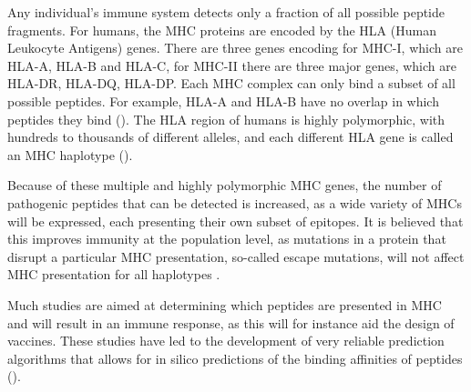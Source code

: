 
Any individual's immune system detects only a fraction of all possible
peptide fragments.
For humans, the MHC proteins are encoded by the
HLA (Human Leukocyte Antigens) genes.
There are three genes encoding for MHC-I, which are HLA-A, HLA-B and HLA-C,
for MHC-II there are three major genes, which are HLA-DR, HLA-DQ, HLA-DP.
Each MHC complex can only bind a subset of all possible peptides.
For example, HLA-A and HLA-B have no overlap in which
peptides they bind (\cite{lund2004definition}).
The HLA region of humans is highly polymorphic, with hundreds 
to thousands of different alleles, 
and each different HLA gene is called 
an MHC haplotype (\cite{marsh2010nomenclature}).


Because of these multiple and highly polymorphic MHC genes,
the number of pathogenic peptides that can be detected is increased,
as a wide variety of MHCs will be expressed,
each presenting their own subset of epitopes.
It is believed that this improves immunity at the population level, 
as mutations in a protein that disrupt a particular MHC presentation, 
so-called escape mutations, 
will not affect MHC presentation for all haplotypes .


Much studies are aimed at determining which peptides are presented in MHC 
and will result in an immune response, 
as this will for instance aid the design of vaccines. 
These studies have led to the development 
of very reliable prediction algorithms 
that allows for in silico predictions 
of the binding affinities of peptides (\cite{larsen2010identification,schellens2008unanticipated,tang2011genome}).
 

